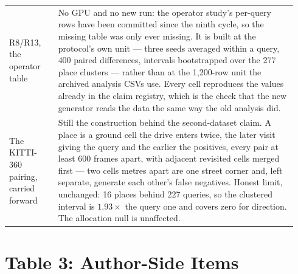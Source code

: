 \documentclass[11pt]{article}
\begin{document}
\begin{longtable}{@{}p{0.16\linewidth}p{0.78\linewidth}@{}}
R8/R13, the operator
table &
No GPU and no new run: the operator study's per-query rows have been committed
since the ninth cycle, so the missing table was only ever missing. It is built
at the protocol's own unit --- three seeds averaged within a query, 400 paired
differences, intervals bootstrapped over the 277 place clusters --- rather
than at the 1{,}200-row unit the archived analysis CSVs use. Every cell
reproduces the values already in the claim registry, which is the check that
the new generator reads the data the same way the old analysis did. \\
\addlinespace

The KITTI-360 pairing,
carried forward &
Still the construction behind the second-dataset claim. A place is a ground
cell the drive enters twice, the later visit giving the query and the earlier
the positives, every pair at least 600 frames apart, with adjacent revisited
cells merged first --- two cells metres apart are one street corner and, left
separate, generate each other's false negatives. Honest limit, unchanged: 16
places behind 227 queries, so the clustered interval is $1.93\times$ the query
one and covers zero for direction. The allocation null is unaffected. \\

\bottomrule
\end{longtable}

\section*{Table 3: Author-Side Items}
\end{document}
